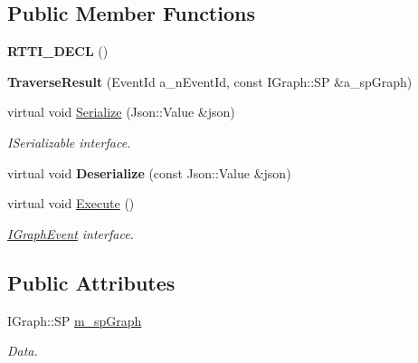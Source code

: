 \subsection*{Public Member Functions}
\begin{DoxyCompactItemize}
\item 
\mbox{\label{struct_graph_connector_1_1_traverse_result_abcbded496f91e2815624f8ab4b3baac3}} 
{\bfseries R\+T\+T\+I\+\_\+\+D\+E\+CL} ()
\item 
\mbox{\label{struct_graph_connector_1_1_traverse_result_aa6e233058b83d644422fc28bf20e21c1}} 
{\bfseries Traverse\+Result} (Event\+Id a\+\_\+n\+Event\+Id, const I\+Graph\+::\+SP \&a\+\_\+sp\+Graph)
\item 
\mbox{\label{struct_graph_connector_1_1_traverse_result_a8fb88cb119179b4c633d8ffecf5033c8}} 
virtual void \hyperlink{struct_graph_connector_1_1_traverse_result_a8fb88cb119179b4c633d8ffecf5033c8}{Serialize} (Json\+::\+Value \&json)
\begin{DoxyCompactList}\small\item\em I\+Serializable interface. \end{DoxyCompactList}\item 
\mbox{\label{struct_graph_connector_1_1_traverse_result_a9679e34907bf19768095cf8372445ed8}} 
virtual void {\bfseries Deserialize} (const Json\+::\+Value \&json)
\item 
\mbox{\label{struct_graph_connector_1_1_traverse_result_a291f1b18ab2d358fb14f36c2a1d32d1d}} 
virtual void \hyperlink{struct_graph_connector_1_1_traverse_result_a291f1b18ab2d358fb14f36c2a1d32d1d}{Execute} ()
\begin{DoxyCompactList}\small\item\em \hyperlink{struct_graph_connector_1_1_i_graph_event}{I\+Graph\+Event} interface. \end{DoxyCompactList}\end{DoxyCompactItemize}
\subsection*{Public Attributes}
\begin{DoxyCompactItemize}
\item 
\mbox{\label{struct_graph_connector_1_1_traverse_result_ab45c7b9f324b573f89d82e9c64ff353f}} 
I\+Graph\+::\+SP \hyperlink{struct_graph_connector_1_1_traverse_result_ab45c7b9f324b573f89d82e9c64ff353f}{m\+\_\+sp\+Graph}
\begin{DoxyCompactList}\small\item\em Data. \end{DoxyCompactList}\end{DoxyCompactItemize}
